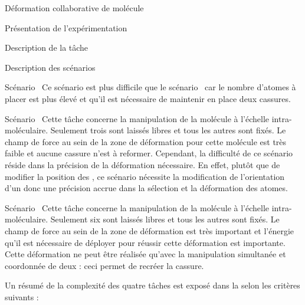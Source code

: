 \documentclass[myfrancais]{mythesis}
\begin{document}
\begin{mychapter}{Déformation collaborative de molécule}
\begin{mysection}{Présentation de l'expérimentation}
\begin{mysubsection}{Description de la tâche}
\begin{mysubsubsection}{Description des scénarios}
\begin{myparagraph}{Scénario~}
						Ce scénario est plus difficile que le scénario~ car le nombre d'atomes à placer est plus élevé et qu'il est nécessaire de maintenir en place deux cassures.
					\end{myparagraph}
					\begin{myparagraph}{Scénario~}
						Cette tâche concerne la manipulation de la molécule \myTRPZIPPER à l'échelle intra-moléculaire.
						Seulement trois  sont laissés libres et tous les autres  sont fixés.
						Le champ de force au sein de la zone de déformation pour cette molécule est très faible et aucune cassure n'est à reformer.
						Cependant, la difficulté de ce scénario réside dans la précision de la déformation nécessaire.
						En effet, plutôt que de modifier la position des , ce scénario nécessite la modification de l'orientation d'un  donc une précision accrue dans la sélection et la déformation des atomes.
					\end{myparagraph}
					\begin{myparagraph}{Scénario~}
						Cette tâche concerne la manipulation de la molécule \myTRPCAGE à l'échelle intra-moléculaire.
						Seulement six  sont laissés libres et tous les autres  sont fixés.
						Le champ de force au sein de la zone de déformation est très important et l'énergie qu'il est nécessaire de déployer pour réussir cette déformation est importante.
						Cette déformation ne peut être réalisée qu'avec la manipulation simultanée et coordonnée de deux  : ceci permet de recréer la cassure.
					\end{myparagraph}

					Un résumé de la complexité des quatre tâches est exposé dans la  selon les critères suivants :


\end{mysubsubsection}
\end{mysubsection}
\end{mysection}
\end{mychapter}
\end{document}
